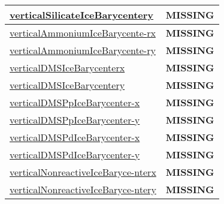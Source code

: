 {\begin{center}
\begin{longtable}{| p{2.0in} | p{4.0in} |}
    \hline
    \hyperref[subsec:var_sec_tracer_barycenter_verticalSilicateIceBarycentery]{verticalSilicateIceBarycentery} & {\bf \color{red} MISSING} \\
    \hline
    \hyperref[subsec:var_sec_tracer_barycenter_verticalAmmoniumIceBarycenterx]{verticalAmmoniumIceBarycente-}\hyperref[subsec:var_sec_tracer_barycenter_verticalAmmoniumIceBarycenterx]{rx  }& {\bf \color{red} MISSING} \\
    \hline
    \hyperref[subsec:var_sec_tracer_barycenter_verticalAmmoniumIceBarycentery]{verticalAmmoniumIceBarycente-}\hyperref[subsec:var_sec_tracer_barycenter_verticalAmmoniumIceBarycentery]{ry  }& {\bf \color{red} MISSING} \\
    \hline
    \hyperref[subsec:var_sec_tracer_barycenter_verticalDMSIceBarycenterx]{verticalDMSIceBarycenterx} & {\bf \color{red} MISSING} \\
    \hline
    \hyperref[subsec:var_sec_tracer_barycenter_verticalDMSIceBarycentery]{verticalDMSIceBarycentery} & {\bf \color{red} MISSING} \\
    \hline
    \hyperref[subsec:var_sec_tracer_barycenter_verticalDMSPpIceBarycenterx]{verticalDMSPpIceBarycenter-}\hyperref[subsec:var_sec_tracer_barycenter_verticalDMSPpIceBarycenterx]{x  }& {\bf \color{red} MISSING} \\
    \hline
    \hyperref[subsec:var_sec_tracer_barycenter_verticalDMSPpIceBarycentery]{verticalDMSPpIceBarycenter-}\hyperref[subsec:var_sec_tracer_barycenter_verticalDMSPpIceBarycentery]{y  }& {\bf \color{red} MISSING} \\
    \hline
    \hyperref[subsec:var_sec_tracer_barycenter_verticalDMSPdIceBarycenterx]{verticalDMSPdIceBarycenter-}\hyperref[subsec:var_sec_tracer_barycenter_verticalDMSPdIceBarycenterx]{x  }& {\bf \color{red} MISSING} \\
    \hline
    \hyperref[subsec:var_sec_tracer_barycenter_verticalDMSPdIceBarycentery]{verticalDMSPdIceBarycenter-}\hyperref[subsec:var_sec_tracer_barycenter_verticalDMSPdIceBarycentery]{y  }& {\bf \color{red} MISSING} \\
    \hline
    \hyperref[subsec:var_sec_tracer_barycenter_verticalNonreactiveIceBarycenterx]{verticalNonreactiveIceBaryce-}\hyperref[subsec:var_sec_tracer_barycenter_verticalNonreactiveIceBarycenterx]{nterx  }& {\bf \color{red} MISSING} \\
    \hline
    \hyperref[subsec:var_sec_tracer_barycenter_verticalNonreactiveIceBarycentery]{verticalNonreactiveIceBaryce-}\hyperref[subsec:var_sec_tracer_barycenter_verticalNonreactiveIceBarycentery]{ntery  }& {\bf \color{red} MISSING} \\

\end{longtable}
\end{center}}
